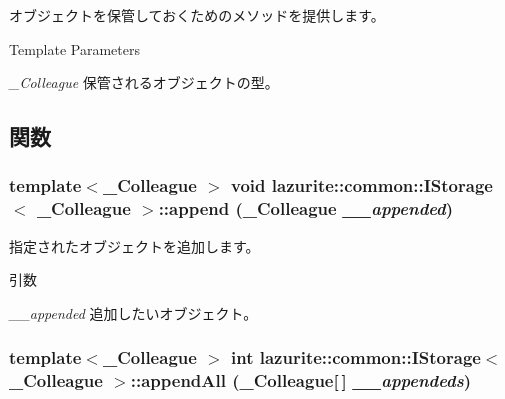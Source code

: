 オブジェクトを保管しておくためのメソッドを提供します。 
\begin{DoxyTemplParams}{Template Parameters}
\item[{\em \_\-Colleague}]保管されるオブジェクトの型。\end{DoxyTemplParams}


\subsection{関数}
\hypertarget{interfacelazurite_1_1common_1_1_i_storage_3_01___colleague_01_4_ad53194b6ac42c987b9c8381bd3fd10a6}{
\subsubsection[{append}]{\setlength{\rightskip}{0pt plus 5cm}template$<$\_\-Colleague $>$ void lazurite::common::IStorage$<$ \_\-Colleague $>$::append (\_\-Colleague {\em \_\-\_\-appended})}}
\label{interfacelazurite_1_1common_1_1_i_storage_3_01___colleague_01_4_ad53194b6ac42c987b9c8381bd3fd10a6}


指定されたオブジェクトを追加します。 
\begin{DoxyParams}{引数}
\item[{\em \_\-\_\-appended}]追加したいオブジェクト。\end{DoxyParams}
\hypertarget{interfacelazurite_1_1common_1_1_i_storage_3_01___colleague_01_4_a989b710a15932535d979a8843c83f762}{
\subsubsection[{appendAll}]{\setlength{\rightskip}{0pt plus 5cm}template$<$\_\-Colleague $>$ int lazurite::common::IStorage$<$ \_\-Colleague $>$::appendAll (\_\-Colleague\mbox{[}$\,$\mbox{]} {\em \_\-\_\-appendeds})}}
\label{interfacelazurite_1_1common_1_1_i_storage_3_01___colleague_01_4_a989b710a15932535d979a8843c83f762}


